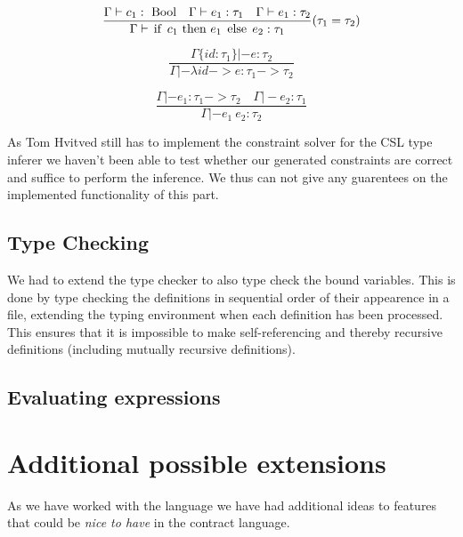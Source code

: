 \documentclass[10pt,a4paper,final,oneside,openany,article]{memoir}
\newcommand{\kw}[1]{\text{\lstinline{#1}}}
\begin{document}
\begin{equation*}
\frac{
  \Gamma |- c_1 : ~\kw{Bool}
  \quad \Gamma |- e_1 : \tau_1
  \quad \Gamma |- e_1 : \tau_2
}{
  \Gamma |- \kw{if}~ c_1 ~\kw{then}~ e_1 ~\kw{else}~ e_2 : \tau_1
}(\tau_1=\tau_2)\label{eq:type_cond}
\end{equation*}

\begin{equation*}
\frac{
  \Gamma\{id : \tau_1\} |- e : \tau_2
}{
  \Gamma |- \lambda id -> e : \tau_1 -> \tau_2
}\label{eq:type_lambda}
\end{equation*}

\begin{equation*}
\frac{
  \Gamma |- e_1 : \tau_1 -> \tau_2
  \quad \Gamma |- e_2 : \tau_1
}{
  \Gamma |- e_1~ e_2 : \tau_2
}\label{eq:type_apply}
\end{equation*}

As Tom Hvitved still has to implement the constraint solver for the
CSL type inferer we haven't been able to test whether our generated
constraints are correct and suffice to perform the inference. We thus
can not give any guarentees on the implemented functionality of this part.


\section{Type Checking}
We had to extend the type checker to also type check the bound
variables. This is done by type checking the definitions in sequential
order of their appearence in a file, extending the typing environment
when each definition has been processed. This ensures that it is
impossible to make self-referencing and thereby recursive definitions
(including mutually recursive definitions).

\section{Evaluating expressions}

\chapter{Additional possible extensions}
As we have worked with the language we have had additional ideas to
features that could be \textit{nice to have} in the contract language.
\end{document}

